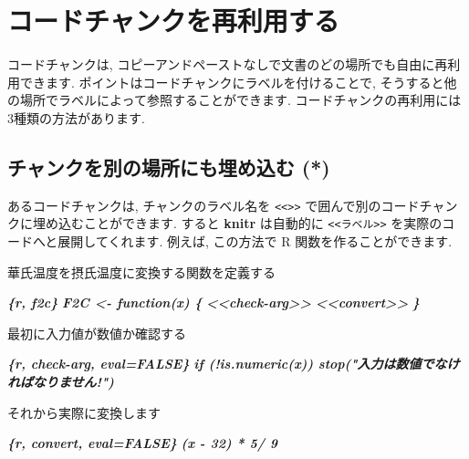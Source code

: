 \documentclass[
  11pt,
  lualatex,ja=standard,jafont=noto]{bxjsreport}
\newenvironment{Shaded}{\begin{snugshade}}{\end{snugshade}}
\newcommand{\InformationTok}[1]{\textcolor[rgb]{0.56,0.35,0.01}{\textbf{\textit{#1}}}}
\newcommand{\NormalTok}[1]{#1}
\begin{document}
\hypertarget{reuse-chunks}{%
\section{コードチャンクを再利用する}\label{reuse-chunks}}

コードチャンクは, コピーアンドペーストなしで文書のどの場所でも自由に再利用できます. ポイントはコードチャンクにラベルを付けることで, そうすると他の場所でラベルによって参照することができます. コードチャンクの再利用には3種類の方法があります.

\hypertarget{embed-chunk}{%
\subsection{チャンクを別の場所にも埋め込む (*)}\label{embed-chunk}}

あるコードチャンクは, チャンクのラベル名を \texttt{\textless{}\textless{}\textgreater{}\textgreater{}} で囲んで別のコードチャンクに埋め込むことができます. すると \textbf{knitr} は自動的に \texttt{\textless{}\textless{}ラベル\textgreater{}\textgreater{}} を実際のコードへと展開してくれます. 例えば, この方法で R 関数を作ることができます.

\begin{Shaded}
\begin{Highlighting}[]
\NormalTok{華氏温度を摂氏温度に変換する関数を定義する}

\InformationTok{\textasciigrave{}\textasciigrave{}\textasciigrave{}\{r, f2c\}}
\InformationTok{F2C \textless{}{-} function(x) \{}
\InformationTok{  \textless{}\textless{}check{-}arg\textgreater{}\textgreater{}}
\InformationTok{  \textless{}\textless{}convert\textgreater{}\textgreater{}}
\InformationTok{\}}
\InformationTok{\textasciigrave{}\textasciigrave{}\textasciigrave{}}

\NormalTok{最初に入力値が数値か確認する}

\InformationTok{\textasciigrave{}\textasciigrave{}\textasciigrave{}\{r, check{-}arg, eval=FALSE\}}
\InformationTok{  if (!is.numeric(x)) stop("入力は数値でなければなりません!")}
\InformationTok{\textasciigrave{}\textasciigrave{}\textasciigrave{}}

\NormalTok{それから実際に変換します}

\InformationTok{\textasciigrave{}\textasciigrave{}\textasciigrave{}\{r, convert, eval=FALSE\}}
\InformationTok{  (x {-} 32) * 5/ 9}
\InformationTok{\textasciigrave{}\textasciigrave{}\textasciigrave{}}
\end{Highlighting}
\end{Shaded}
\end{document}
